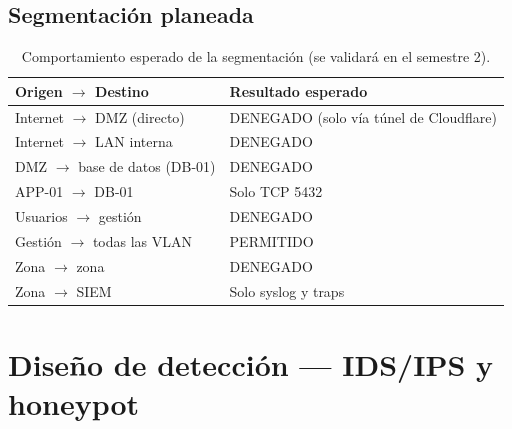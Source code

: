 \subsection{Segmentación planeada}

\begin{table}[H]
\centering
\caption{Comportamiento esperado de la segmentación (se validará en el semestre 2).}
\label{tab:ce03-segmentacion}
\small
\begin{tabularx}{\textwidth}{XL{4.6cm}}
\toprule
\textbf{Origen $\rightarrow$ Destino} & \textbf{Resultado esperado} \\
\midrule
Internet $\rightarrow$ DMZ (directo) & DENEGADO (solo vía túnel de Cloudflare) \\
Internet $\rightarrow$ LAN interna & DENEGADO \\
DMZ $\rightarrow$ base de datos (DB-01) & DENEGADO \\
APP-01 $\rightarrow$ DB-01 & Solo TCP 5432 \\
Usuarios $\rightarrow$ gestión & DENEGADO \\
Gestión $\rightarrow$ todas las VLAN & PERMITIDO \\
Zona $\rightarrow$ zona & DENEGADO \\
Zona $\rightarrow$ SIEM & Solo syslog y traps \\
\bottomrule
\end{tabularx}
\end{table}

\section{Diseño de detección — IDS/IPS y honeypot}
\label{sec:ce03-deteccion}

